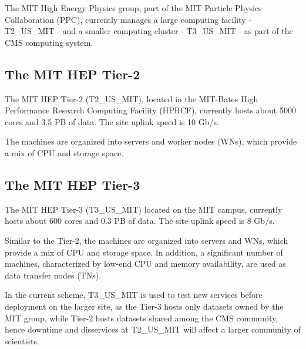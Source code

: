 The MIT High Energy Physics group, part of the MIT Particle Physics Collaboration (PPC), 
currently manages a large computing facility - T2\_US\_MIT - and a smaller computing cluster 
- T3\_US\_MIT - as part of the CMS computing system.

\subsection{The MIT HEP Tier-2}

The MIT HEP Tier-2 (T2\_US\_MIT), located in the MIT-Bates High Performance Research Computing 
Facility (HPRCF), currently hosts about 5000 cores and 3.5 PB of data. The site uplink
speed is 10 Gb/s.

The machines are organized into servers and worker nodes (WNs), which provide a mix of CPU and 
storage space. 

\subsection{The MIT HEP Tier-3}

The MIT HEP Tier-3 (T3\_US\_MIT) located on the MIT campus, currently hosts about 600
cores and 0.3 PB of data. The site uplink speed is 8 Gb/s.

Similar to the Tier-2, the machines are organized into servers and WNs, which provide a mix of CPU and storage 
space. In addition, a significant number of machines, characterized by low-end CPU and memory 
availability, are used as data transfer nodes (TNs).

In the current scheme, T3\_US\_MIT is used to test new services before deployment on the larger site, 
as the Tier-3 hosts only datasets owned by the MIT group, while Tier-2 hosts datasets shared among the 
CMS community, hence downtime and disservices at T2\_US\_MIT will affect a larger community of scientists.



